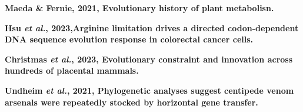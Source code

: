 \documentclass[11pt]{article}
\begin{document}
\begin{sloppypar}
\par
\textbf{Maeda & Fernie, 2021, Evolutionary history of plant metabolisn.} \newline
\par
\textbf{Hsu \textit{et al.}, 2023,Arginine limitation drives a directed codon-dependent DNA sequence evolution response in colorectal cancer cells.} \newline
\par
\textbf{Christmas \textit{et al.}, 2023, Evolutionary constraint and innovation across hundreds of placental mammals.} \newline
\par
\textbf{Undheim \textit{et al.}, 2021, Phylogenetic analyses suggest centipede venom arsenals were repeatedly stocked by horizontal gene transfer.} \newline
\par


\end{sloppypar}
\end{document}

